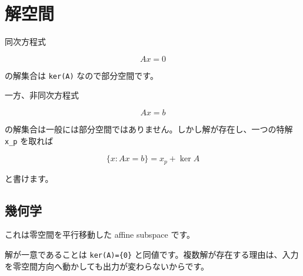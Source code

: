 \documentclass[
  11pt,
  a4paper,
]{ltjsarticle}
\author{}
\date{}
\begin{document}
\hypertarget{ux89e3ux7a7aux9593}{%
\section{解空間}\label{ux89e3ux7a7aux9593}}

同次方程式

\[
Ax=0
\]

の解集合は \texttt{ker(A)} なので部分空間です。

一方、非同次方程式

\[
Ax=b
\]

の解集合は一般には部分空間ではありません。しかし解が存在し、一つの特解
\texttt{x\_p} を取れば

\[
\{x:Ax=b\}=x_p+\ker A
\]

と書けます。

\hypertarget{ux5e7eux4f55ux5b66}{%
\subsection{幾何学}\label{ux5e7eux4f55ux5b66}}

これは零空間を平行移動した affine subspace です。

解が一意であることは \texttt{ker(A)=\{0\}}
と同値です。複数解が存在する理由は、入力を零空間方向へ動かしても出力が変わらないからです。
\end{document}

